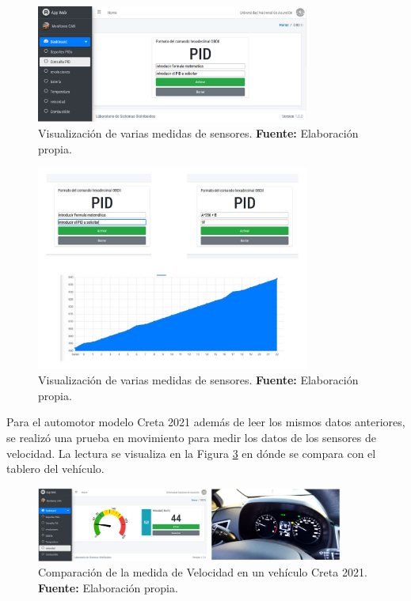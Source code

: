 \begin{figure}[H]
	\centering
	\includegraphics[width=0.8\textwidth]{./Cap6imagen/consulta_fig_c6.png}
	\caption [Visualización de varias medidas de sensores.]{Visualización de varias medidas de sensores.  \textbf{ Fuente:} %
		Elaboración propia.}
	\label{consulta_ref_c6} %
\end{figure}

\begin{figure}[H]
	\centering
	\includegraphics[width=0.8\textwidth]{./Cap6imagen/grafica_fig_c6.jpg}
	\caption [Visualización de varias medidas de sensores.]{Visualización de varias medidas de sensores.  \textbf{ Fuente:} %
		Elaboración propia.}
	\label{grafica_ref_c6} %
\end{figure}

Para el automotor modelo Creta 2021 además de leer los mismos datos anteriores, se realizó una prueba en movimiento para medir los datos de los sensores de velocidad. 
La lectura se visualiza en la Figura \ref{vel_ref_c6} en dónde se compara con el tablero del vehículo.

\begin{figure}[H]
	\centering
	\includegraphics[width=0.9\textwidth]{./Cap6imagen/vel_fig_c6.png}
	\caption [Comparación de la medida de Velocidad en un vehículo Creta 2021.]{Comparación de la medida de Velocidad en un vehículo Creta 2021.  \textbf{ Fuente:} %
		Elaboración propia.}
	\label{vel_ref_c6} %
\end{figure}

